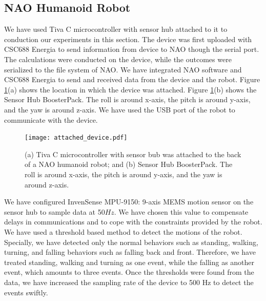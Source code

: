 \documentclass[letterpaper]{article}
\begin{document}
%

\subsection{NAO Humanoid Robot}

We have used Tiva C microcontroller with sensor hub attached to it to conduction our experiments in
this section. The device was first uploaded with CSC688 Energia to send information from device to
NAO though the serial port. The calculations were conducted on the device, while the outcomes were
serialized to the file system of NAO. We have integrated NAO software and CSC688 Energia to send and
received data from the device and the robot. Figure \ref{fig:attached_device}(a) shows the location
in which the device was attached. Figure \ref{fig:attached_device}(b) shows the Sensor Hub
BoosterPack. The roll is around x-axis, the pitch is around y-axis, and the yaw is around z-axis. 
We have used the USB port of the robot to communicate with the device.  


\begin{figure}[!ht]
\centering
 \texttt{[image: attached\_device.pdf]}
 \caption{(a) Tiva C microcontroller with sensor bub was attached to the back of a NAO humanoid
robot; and (b) Sensor Hub BoosterPack. The roll is around x-axis, the pitch is around y-axis, and
the yaw is around z-axis.}
 \label{fig:attached_device}
\end{figure}

We have configured InvenSense MPU-9150: 9-axis MEMS motion sensor on the sensor hub to sample data
at 50$Hz$. We have chosen this value to compensate delays in communications and to cope with the
constraints provided by the robot. We have used a threshold based method to detect the motions of
the robot. Specially, we have detected only the normal behaviors such as standing, walking, turning,
and falling behaviors such as falling back and front. Therefore, we have treated standing, walking
and turning as one event, while the falling as another event, which amounts to three events. Once
the thresholds were found from the data, we have increased the sampling rate of the device to 500 Hz
to detect the events swiftly.  
\end{document}
